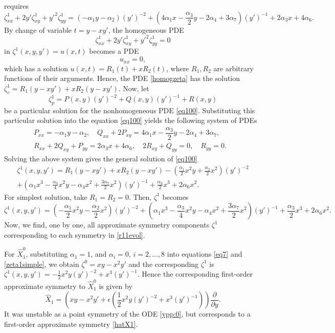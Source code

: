 \documentclass[11pt,letter,subeqn]{article}
\def\beq{\begin{equation}}
\def\eeq{\end{equation}}
\def\barr{\begin{array}{ll}}
\def\earr{\end{array}}
\begin{document}
   requires
   \begin{equation}\label{eq100}
    \zeta^1_{xx}+2y'\zeta^1_{xy}+{y'}^{2}\zeta^1_{yy}=\left(-\alpha_1y-\alpha_2\right)(y')^{-2}+\left(4\alpha_1
    x-\frac{\alpha_3}{2}y-2\alpha_4+3\alpha_7\right)(y')^{-1}+2\alpha_3x+4\alpha_6.
  \end{equation}
  By change of variable $t=y-xy'$, the homogeneous PDE
  \begin{equation}\label{homogzeta}
    \zeta^1_{xx}+2y'\zeta^1_{xy}+{y'}^{2}\zeta^1_{yy}=0
  \end{equation}
  in  $\zeta^1(x,y,y')=u(x,t)$ becomes a PDE
  \[
    u_{xx}=0,
  \]
  which has a solution $u(x,t)=R_1(t)+xR_2(t)$, where $R_1, R_2$ are arbitrary functions of their arguments. Hence, the PDE \eqref{homogzeta} has the solution $\zeta^1_c=R_1(y-xy')+xR_2(y-xy')$. Now, let
  \[
    \zeta^1_p=P(x,y)(y')^{-2}+Q(x,y)(y')^{-1}+R(x,y)
  \]
  be a particular solution for the nonhomogeneous PDE \eqref{eq100}. Substituting this particular solution into the equation \eqref{eq100} yields the following system of PDEs
 \beq\label{}
\barr
P_{xx}=-\alpha_1y-\alpha_2,\quad  Q_{xx}+2P_{xy}=4\alpha_1
    x-\dfrac{\alpha_3}{2}y-2\alpha_4+3\alpha_7,& \\[2ex]
  R_{xx}+2Q_{xy}+P_{yy}= 2\alpha_3x+4\alpha_6, \quad  2R_{xy}+Q_{yy}=0, \quad R_{yy}=0.&
\earr
\eeq
  Solving the above system gives the general solution of \eqref{eq100}
  \begin{multline}\label{eq10002}
    \zeta^1(x,y,y')=R_1(y-xy')+xR_2(y-xy')-\left(\frac{\alpha_1}{2}x^2y+\frac{\alpha_2}{2}x^2\right)(y')^{-2}\\+\left(\alpha_1
    x^3-\frac{\alpha_3}{4}x^2y-\alpha_4x^2+\frac{3\alpha_7}{2}x^2\right)(y')^{-1}+\frac{\alpha_3}{2}x^3+2\alpha_6x^2.
  \end{multline}
  For simplest solution, take $R_1=R_2=0$. Then, $\zeta^1$ becomes
  \begin{equation}\label{zeta1simple}
    \zeta^1(x,y,y')=\left(-\frac{\alpha_1}{2}x^2y-\frac{\alpha_2}{2}x^2\right)(y')^{-2}+\left(\alpha_1
    x^3-\frac{\alpha_3}{4}x^2y-\alpha_4x^2+\frac{3\alpha_7}{2}x^2\right)(y')^{-1}+\frac{\alpha_3}{2}x^3+2\alpha_6x^2.
  \end{equation}
  Now, we find, one by one, all approximate symmetry components $\zeta^1$ corresponding to each symmetry in \eqref{r11evol}.

  For $\hat{X}^{0}_1$, substituting $\alpha_1=1$, and
  $\alpha_i=0,\,i=2,...,8$ into equations \eqref{eq7} and \eqref{zeta1simple}, we obtain $\zeta^0=xy-x^2y'$ and the corresponding $\zeta^1$ is
  $\zeta^1(x,y,y')=-\frac{1}{2}x^2y(y')^{-2}+ x^3(y')^{-1}$. Hence the corresponding first-order approximate symmetry to $\hat{X}^{0}_1$ is given by
  \begin{equation}\label{hatX1}
    \hat{X}_1=\left(xy-x^2y'+\epsilon\left(\dfrac{1}{2}x^2y(y')^{-2}+ x^3(y')^{-1}\right)\right)\dfrac{\partial}{\partial y}.
  \end{equation}
  It was {\textrm{unstable}} as a point symmetry of the ODE \eqref{ypp:0}, but corresponds to a first-order approximate symmetry \eqref{hatX1}.
\end{document}
